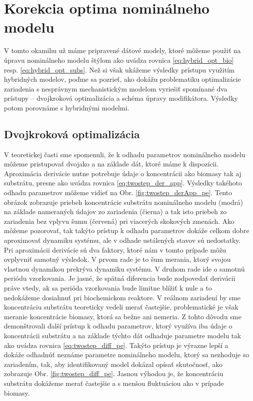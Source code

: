 \section{Korekcia optima nominálneho modelu}
V tomto okamihu už máme pripravené dátové modely, ktoré môžeme použiť na úpravu nominálneho modelu štýlom ako uvádza rovnica \ref{eq:hybrid_opt_bio} resp. \ref{eq:hybrid_opt_subs}. Než si však ukážeme výsledky prístupu využitím hybridných modelov, poďme sa pozrieť, ako dokážu problematiku optimalizácie zariadenia s nesprávnym mechanistickým modelom vyriešiť spomínané dva prístupy -- dvojkroková optimalizácia a schéma úpravy modifikátora. Výsledky potom porovnáme s hybridnými modelmi. 

\subsection{Dvojkroková optimalizácia}
V teoretickej časti sme spomenuli, že k odhadu parametrov nominálneho modelu môžeme pristupovať dvojako a na základe dát, ktoré máme k dispozícii. Aproximácia derivácie nutne potrebuje údaje o koncentrácii ako biomasy tak aj substrátu, presne ako uvádza rovnica \eqref{eq:twostep_der_app}. Výsledky takéhoto odhadu parametrov môžeme vidieť na Obr. \ref{fig:twostep_derApp_pe}. Tento obrázok zobrazuje priebeh koncentrácie substrátu nominálneho modelu (modrá) na základe nameraných údajov zo zariadenia (čierna) a tak isto priebeh zo zariadenia bez vplyvu šumu (červená) pri viacerých skokových zmenách. Ako môžeme pozorovať, tak takýto prístup k odhadu parametrov dokáže celkom dobre aproximovať dynamiku systému, ale v odhade ustálených stavov sú nedostatky. Pri aproximácii derivácie sú dva faktory, ktoré nám v tomto prípade môžu ovplyvniť samotný výsledok. V prvom rade je to šum merania, ktorý svojou vlastnou dynamikou prekrýva dynamiku systému. V druhom rade ide o samotnú periódu vzorkovania. Je jasné, že spätná diferencia bude zodpovedať derivácii práve vtedy, ak sa perióda vzorkovania bude limitne blížiť k nule a to nedokážeme dosiahnuť pri biochemickom reaktore. V reálnom zariadení by sme koncentráciu substrátu teoreticky vedeli merať častejšie, problematické je však meranie koncentrácie biomasy, ktorá sa bežne ani nemeria. Z tohto dôvodu sme demonštrovali ďalší prístup k odhadu parametrov, ktorý využíva iba údaje o koncentrácii substrátu a na základe týchto dát odhaduje parametre modelu tak ako uvádza rovnica \eqref{eq:twostep_diff_pe}. Takýto prístup je výrazne lepší a dokáže  odhadnúť neznáme parametre nominálneho modelu, ktorý sa nezhoduje so zariadením, tak, aby identifikovaný model dokázal opísať skutočnosť, ako zobrazuje Obr. \ref{fig:twostep_diff_pe}. Jasnou výhodou je, že koncentráciu substrátu dokážeme merať častejšie a s menšou fluktuáciou ako v prípade biomasy. 
